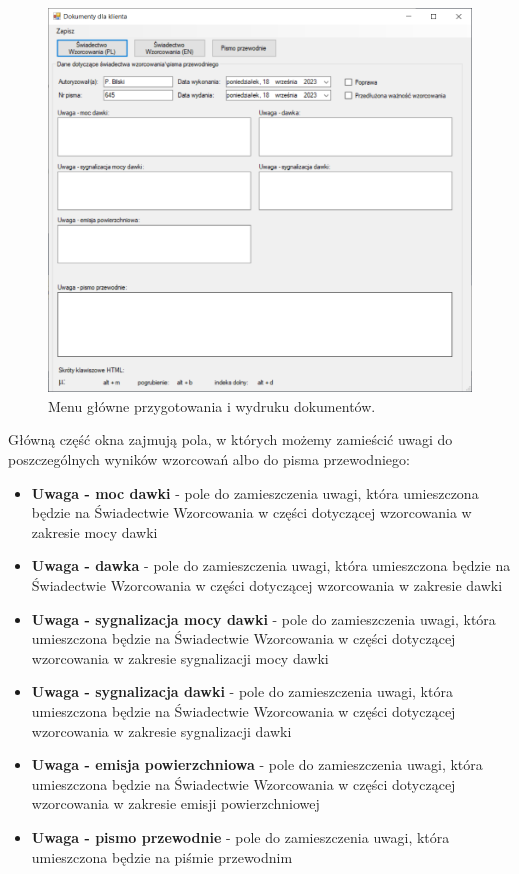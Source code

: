 	\begin{figure}[htb]
		\centering
		\includegraphics[width=\columnwidth]{obrazki/Wzorcowanie/menu_swiadectwo.png}
		\caption{Menu główne przygotowania i wydruku dokumentów.}
		\label{menuSwiadectwo}
	\end{figure}

	Główną część okna zajmują pola, w których możemy zamieścić uwagi do poszczególnych wyników wzorcowań albo do pisma przewodniego:
	\begin{itemize}
		\item \textbf{Uwaga - moc dawki} - pole do zamieszczenia uwagi, która umieszczona będzie na Świadectwie Wzorcowania w części dotyczącej wzorcowania w zakresie mocy dawki
		\item \textbf{Uwaga - dawka} - pole do zamieszczenia uwagi, która umieszczona będzie na Świadectwie Wzorcowania w części dotyczącej wzorcowania w zakresie dawki
		\item \textbf{Uwaga - sygnalizacja mocy dawki} - pole do zamieszczenia uwagi, która umieszczona będzie na Świadectwie Wzorcowania w części dotyczącej wzorcowania w zakresie sygnalizacji mocy dawki
		\item \textbf{Uwaga - sygnalizacja dawki} - pole do zamieszczenia uwagi, która umieszczona będzie na Świadectwie Wzorcowania w części dotyczącej wzorcowania w zakresie sygnalizacji dawki
		\item \textbf{Uwaga - emisja powierzchniowa} - pole do zamieszczenia uwagi, która umieszczona będzie na Świadectwie Wzorcowania w części dotyczącej wzorcowania w zakresie emisji powierzchniowej
		\item \textbf{Uwaga - pismo przewodnie} - pole do zamieszczenia uwagi, która umieszczona będzie na piśmie przewodnim
	\end{itemize}

